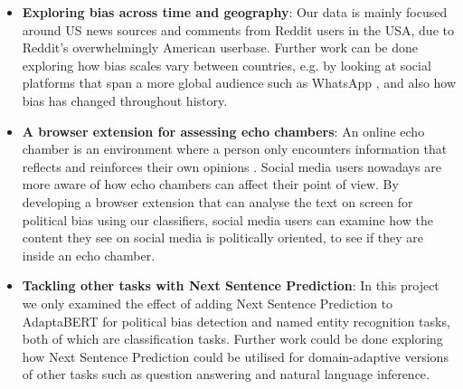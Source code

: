 \begin{itemize}
    \item \textbf{Exploring bias across time and geography}: Our data is mainly focused around US news sources and comments from Reddit users in the USA, due to Reddit's overwhelmingly American userbase. Further work can be done exploring how bias scales vary between countries, e.g. by looking at social platforms that span a more global audience such as WhatsApp \cite{whatsapp-countries}, and also how bias has changed throughout history.
    \item \textbf{A browser extension for assessing echo chambers}: An online echo chamber is an environment where a person only encounters information that reflects and reinforces their own opinions \cite{echo-chambers}. Social media users nowadays are more aware of how echo chambers can affect their point of view. By developing a browser extension that can analyse the text on screen for political bias using our classifiers, social media users can examine how the content they see on social media is politically oriented, to see if they are inside an echo chamber.
    \item \textbf{Tackling other tasks with Next Sentence Prediction}: In this project we only examined the effect of adding Next Sentence Prediction to AdaptaBERT for political bias detection and named entity recognition tasks, both of which are classification tasks. Further work could be done exploring how Next Sentence Prediction could be utilised for domain-adaptive versions of other tasks such as question answering and natural language inference.
\end{itemize}




